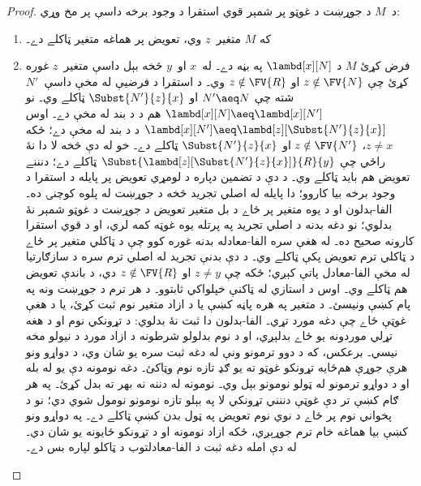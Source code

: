\documentclass[../../../include/open-logic-section]{subfiles}
\begin{document}
\begin{proof}
  د~$M$ د جوړښت د غوټو پر شمېر قوي استقرا د وجود برخه
  داسې پر مخ وړي:
  \begin{enumerate}
  \item که $M$ متغير~$z$ وي، تعويض پر هماغه متغير ټاکلے دے۔
  \item فرض کړئ $M$ د $\lambd[x][N]$ په بڼه دے۔ له~$x$ او~$y$
    څخه بېل داسې متغير~$z$ غوره کړئ چې $z \notin \FV{N}$ او
    $z \notin \FV{R}$ وي۔ د استقرا د فرضيې له مخې داسې~$N'$ شته
    چې $N' \aeq N$ او $\Subst{N'}{z}{x}$ ټاکلے وي۔ نو
    $\lambd[x][N] \aeq \lambd[x][N']$ هم د
     د  بند له مخې دے۔
    اوس $\lambd[x][N'] \aeq
    \lambd[z][\Subst{N'}{z}{x}]$ د
     د  بند له مخې دے؛ ځکه
    $z \ne x$، $z \notin \FV{N'}$ او $\Subst{N'}{z}{x}$ ټاکلے دے۔
    خو له دې څخه لا دا نۀ راځي چې
    $\Subst{\lambd[z][\Subst{N'}{z}{x}]}{R}{y}$ ټاکلے دے؛
    دنننے تعويض هم بايد ټاکلے وي۔ د دې د تضمين دپاره د لومړي
    تعويض پر پايله د استقرا د وجود برخه بيا کاروو؛ دا پايله له
    اصلي تجريد څخه د جوړښت له پلوه کوچنۍ ده۔ الفا-بدلون
    او د يوه متغير پر ځاے د بل متغير تعويض د جوړښت د غوټو
    شمېر نۀ بدلوي؛ نو دغه بدنه د اصلي تجريد په پرتله يوه
    غوټه کمه لري، او د قوي استقرا کارونه صحيح ده۔ له هغې سره
    الفا-معادله بدنه غوره کوو چې د ټاکلي متغير پر ځاے د ټاکلي
    ترم تعويض پکې ټاکلے وي۔ د دې بدنې تجريد له اصلي ترم سره
    د سازګارتيا له مخې الفا-معادل پاتې کېږي؛ ځکه چې
    $z \neq y$ او $z \notin \FV{R}$ دي، د باندې تعويض هم
    ټاکلے وي۔
    اوس د استازي له ټاکنې خپلواکي ثابتوو۔ د هر ترم د جوړښت ونه په
    پام کښې ونيسئ۔ د متغير په هره پاڼه کښې يا د ازاد متغير نوم
    ثبت کړئ، يا د هغې غوټې ځاے چې دغه مورد تړي۔ الفا-بدلون دا
    ثبت نۀ بدلوي: د تړونکي نوم او د هغه تړلي موردونه يو ځاے
    بدلېږي، او د نوم بدلولو شرطونه د ازاد مورد د نيولو مخه نيسي۔
    برعکس، که د دوو ترمونو ونې له دغه ثبت سره يو شان وي، د
    دواړو ونو هرې جوړې هم‌ځايه تړونکو غوټو ته يو ګډ تازه نوم
    وټاکئ۔ دغه نومونه دې يو له بله او د دواړو ترمونو له ټولو
    نومونو بېل وي۔ نومونه له دننه نه بهر ته بدل کړئ۔ په هر ګام
    کښې تر دې غوټې دننني تړونکي لا په بېلو تازه نومونو نومول
    شوي دي؛ نو د پخواني نوم پر ځاے د نوي نوم تعويض په ټول
    بدن کښې ټاکلے دے۔ په دواړو ونو کښې بيا هماغه خام ترم
    جوړېږي، ځکه ازاد نومونه او د تړونکو ځايونه يو شان دي۔
    له دې امله دغه ثبت د الفا-معادلتوب د ټاکلو لپاره بس دے۔


\end{enumerate}
\end{proof}
\end{document}
